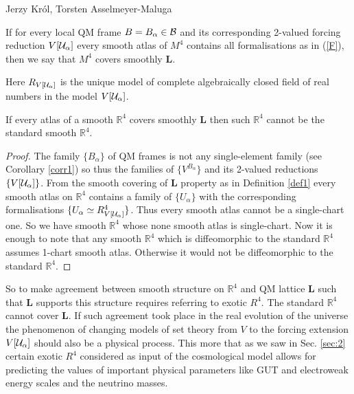 \begin{artengenv2auth}{Jerzy Kr\'ol, Torsten Asselmeyer-Maluga}
\begin{Definition}
If for every local QM frame $B=B_{\alpha}\in {\cal B}$ and its corresponding 2-valued forcing reduction $V[{\cal U}_{\alpha}]$ every smooth atlas of $M^4$ contains all formalisations as in (\ref{F}), then we say that $M^4$ covers smoothly {\bf L}.  
\end{Definition}
Here $R_{V[{\cal U}_{\alpha}]}$ is the unique model of complete algebraically closed field of real numbers in the model $V[{\cal U}_{\alpha}]$.
\begin{Theorem}
If every atlas of a smooth $\mathbb{R}^4$ covers smoothly {\bf L} then such $\mathbb{R}^4$ cannot be the standard smooth $\mathbb{R}^4$.
\end{Theorem}
\begin{proof}
The family $\{B_{\alpha}\}$ of QM frames is not any single-element family (see Corollary \ref{corr1}) so thus the families of $\{V^{B_{\alpha}}\}$ and its 2-valued reductions $\{V[{\cal U}_{\alpha}]\}$. From the smooth covering of {\bf L} property as in Definition \ref{def1} every smooth atlas on $\mathbb{R}^4$ contains a family of $\{U_{\alpha}\}$ with the corresponding formalisations $\{U_{\alpha}\simeq R^4_{V[{\cal U}_{\alpha}]} \}$. Thus every smooth atlas cannot be a single-chart one. 
So we have smooth $\mathbb{R}^4$ whose none smooth atlas is single-chart. Now it is enough to note that any smooth $\mathbb{R}^4$ which is diffeomorphic to the standard $\mathbb{R}^4$ assumes 1-chart smooth atlas. Otherwise it would not be diffeomorphic to the standard $\mathbb{R}^4$.
\end{proof}
So to make agreement between smooth structure on $\mathbb{R}^4$ and QM lattice {\bf L} such that {\bf L} supports this structure requires referring to exotic $R^4$. The standard $\mathbb{R}^4$ cannot cover {\bf L}. If such agreement took place in the real evolution of the universe the phenomenon of changing models of set theory from $V$ to the forcing extension $V[{\cal U}_{\alpha}]$ should also be a physical process. This more that as we saw in Sec. \ref{sec:2} certain exotic $R^4$ considered as input of the cosmological model allows for predicting the values of important physical parameters like GUT and electroweak energy scales and the neutrino masses. 


\end{artengenv2auth}
